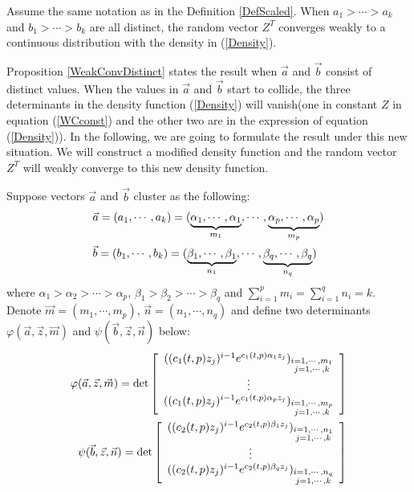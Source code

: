 \begin{proposition}{\label{WeakConvDistinct}}
Assume the same notation as in the Definition \ref{DefScaled}. When $a_{1}> \cdots > a_{k}$ and $b_{1}> \cdots > b_{k}$ are all distinct, the random vector $Z^{T}$ converges weakly to a continuous distribution with the density in (\ref{Density}).	
\end{proposition}

Proposition \ref{WeakConvDistinct} states the result when $\vec{a}$ and $\vec{b}$ consist of distinct values. When the values in $\vec{a}$ and $\vec{b}$ start to collide, the three determinants in the density function (\ref{Density}) will vanish(one in constant $Z$ in equation (\ref{WCconst}) and the other two are in the expression of equation (\ref{Density})). In the following, we are going to formulate the result under this new situation. We will construct a modified density function and the random vector $Z^{T}$ will weakly converge to this new density function.

Suppose vectors $\vec{a}$ and $\vec{b}$ cluster as the following:
\begin{align}{\label{Block}}
\begin{split}
	&\vec{a}=(a_{1},\cdots,a_{k})=(\underbrace{\alpha_{1},\cdots,\alpha_{1}}_{m_{1}},\cdots,\underbrace{\alpha_{p},\cdots,\alpha_{p}}_{m_{p}})\\
	&\vec{b}=(b_{1},\cdots,b_{k})=(\underbrace{\beta_{1},\cdots,\beta_{1}}_{n_{1}},\cdots,\underbrace{\beta_{q},\cdots,\beta_{q}}_{n_{q}})
\end{split}
\end{align}
where $\alpha_{1}>\alpha_{2}>\cdots>\alpha_{p}$, $\beta_{1}>\beta_{2}>\cdots>\beta_{q}$ and $\sum_{i=1}^{p}m_{i}=\sum_{i=1}^{q}n_{i}=k$. Denote $\vec{m}=(m_{1},\cdots,m_{p})$, $\vec{n}=(n_{1},\cdots,n_{q})$ and define two determinants $\varphi(\vec{a},\vec{z},\vec{m})$ and $\psi(\vec{b},\vec{z},\vec{n})$ below:
\begin{equation}{\label{TwoDet}}
\begin{split}
	\varphi(\vec{a},\vec{z},\vec{m})= \det
	\left[ \begin{array}{ccc}
		((c_{1}(t,p)z_{j})^{i-1}e^{c_{1}(t,p)\alpha_{1}z_{j}})_{\substack{i=1,\cdots,m_{1}\\j=1,\cdots,k}}\\
	\vdots\\
	((c_{1}(t,p)z_{j})^{i-1}e^{c_{1}(t,p)\alpha_{p}z_{j}})_{\substack{i=1,\cdots,m_{p} \\j=1,\cdots,k}}
	\end{array}
	\right]
\\
	\psi(\vec{b},\vec{z},\vec{n})= \det
	\left[ \begin{array}{ccc}
		((c_{2}(t,p)z_{j})^{i-1}e^{c_{2}(t,p)\beta_{1}z_{j}})_{\substack{i=1,\cdots,n_{1}\\j=1,\cdots,k}}\\
	\vdots\\
	((c_{2}(t,p)z_{j})^{i-1}e^{c_{2}(t,p)\beta_{q}z_{j}})_{\substack{i=1,\cdots, n_{q} \\j=1,\cdots,k}}
	\end{array}
	\right]
\end{split}
\end{equation}

